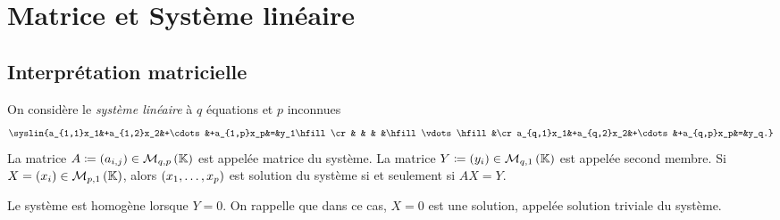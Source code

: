 \documentclass{magnolia}
\begin{document}
\section{Matrice et Système linéaire}


\subsection{Interprétation matricielle}

\begin{definition}
On considère le \emph{système linéaire} à $q$ équations et $p$ inconnues
\[\syslin{a_{1,1}x_1&+a_{1,2}x_2&+\cdots&+a_{1,p}x_p&=&y_1\hfill\cr
                    &          &       &          &\hfill\vdots\hfill&\cr
          a_{q,1}x_1&+a_{q,2}x_2&+\cdots&+a_{q,p}x_p&=&y_q.}\]
La matrice $A\coloneqq\left(a_{i,j}\right)\in\mathcal{M}_{q,p}\left(\mathbb{K}\right)$ est appelée matrice du système.
La matrice $Y\coloneqq\left(y_i\right)\in\mathcal{M}_{q,1}\left(\mathbb{K}\right)$ est appelée second membre. Si
$X=\left(x_i\right)\in\mathcal{M}_{p,1}\left(\mathbb{K}\right)$, alors $\left(x_1,\ldots,x_p\right)$ est solution du
système si et seulement si $AX=Y$.
\end{definition}

\begin{remarqueUnique}
\remarque Le système est homogène lorsque $Y=0$. On rappelle que dans ce cas,
  $X=0$ est une solution, appelée solution triviale du système.
\end{remarqueUnique}

 
\end{document}
